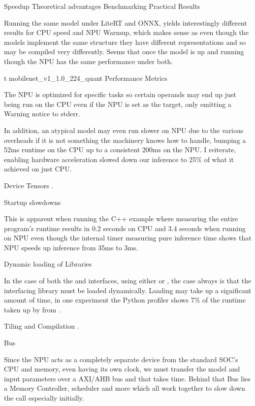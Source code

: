 \chap Speedup
\sec Theoretical advantages
\sec Benchmarking Practical Results

Running the same model under LiteRT and ONNX,
yields interestingly different results for CPU
speed and NPU Warmup, which makes sense
as even though the models implement the same
structure they have different representations and
so may be compiled very differently.
Seems that once the model is up and running though
the NPU has the same performance under both.

\midinsert
{}
\caption/t mobilenet_v1_1.0_224_quant Performance Metrics
\endinsert

The NPU is optimized for specific tasks
so certain operands may end up just being run
on the CPU even if the NPU is set as the target,
only emitting a Warning notice to stderr.

In addition, an atypical model may even run slower
on NPU due to the various overheads if
it is not something the machinery knows how to handle,
bumping a 52ms runtime on the CPU up to
a consistent 200ms on the NPU.
I reiterate,
enabling hardware acceleration slowed down
our inference to 25\% of what it achieved on just CPU.

\sec Device Tensors
.

\sec Startup slowdowns

This is apparent when running the C++ example where
measuring the entire program's runtime
results in 0.2 seconds on CPU and
3.4 seconds when running on NPU
even though the internal timer
measuring pure inference time shows
that NPU speeds up inference from 35ms to 3ms.

\secc Dynamic loading of Libraries

In the case of both the  and  interfaces,
using either  or ,
the case always is that the interfacing library
must be loaded dynamically.
Loading may take up a significant amount of time,
in one experiment the Python profiler
shows 7\% of the runtime taken up by  from .

\secc Tiling and Compilation
.

\secc Bus

Since the NPU acts as a completely separate device from the
standard SOC's CPU and memory,
even having its own clock,
we must transfer the model and input parameters
over a AXI/AHB bus
and that takes time.
Behind that Bus lies a Memory Controller,
scheduler and more which all work together to slow down the call
especially initially.

